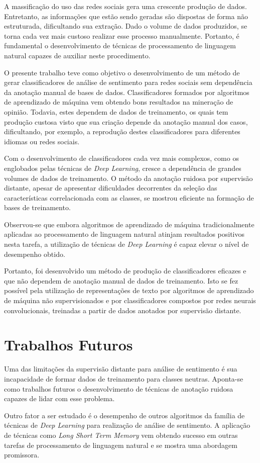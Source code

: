 A massificação do uso das redes sociais gera uma crescente produção de dados.
Entretanto, as informações que estão sendo geradas são dispostas de forma não estruturada, dificultando sua extração.
Dado o volume de dados produzidos, se torna cada vez mais custoso realizar esse processo manualmente.
Portanto, é fundamental o desenvolvimento de técnicas de processamento de linguagem natural capazes de auxiliar neste
procedimento.

O presente trabalho teve como objetivo o desenvolvimento de um método de gerar classificadores de análise de sentimento
para redes sociais sem dependência da anotação manual de bases de dados.
Classificadores formados por algoritmos de aprendizado de máquina vem obtendo bons resultados na mineração de opinião.
Todavia, estes dependem de dados de treinamento, os quais tem produção custosa visto que sua criação depende da anotação
manual dos casos, dificultando, por exemplo, a reprodução destes classificadores para diferentes idiomas ou redes
sociais.

Com o desenvolvimento de classificadores cada vez mais complexos, como os englobados pelas técnicas de
\textit{Deep Learning}, cresce a dependência de grandes volumes de dados de treinamento.
O método da anotação ruidosa por supervisão distante, apesar de apresentar dificuldades decorrentes da seleção das
características correlacionada com as classes, se mostrou eficiente na formação de bases de treinamento.

Observou-se que embora algoritmos de aprendizado de máquina tradicionalmente aplicadas ao processamento de linguagem
natural atinjam resultados positivos nesta tarefa, a utilização de técnicas de \textit{Deep Learning} é capaz elevar o
nível de desempenho obtido.

Portanto, foi desenvolvido um método de produção de classificadores eficazes e que não dependem de anotação manual de
dados de treinamento.
Isto se fez possível pela utilização de representações de texto por algoritmos de aprendizado de máquina não
supervisionados e por classificadores compostos por redes neurais convolucionais, treinadas a partir de dados anotados
por supervisão distante.

\section{Trabalhos Futuros}

Uma das limitações da supervisão distante para análise de sentimento é sua incapacidade de formar dados de treinamento
para classes neutras.
Aponta-se como trabalhos futuros o desenvolvimento de técnicas de anotação ruidosa capazes de lidar com esse problema.

Outro fator a ser estudado é o desempenho de outros algoritmos da família de técnicas de \textit{Deep Learning} para
realização de análise de sentimento.
A aplicação de técnicas como \textit{Long Short Term Memory} vem obtendo sucesso em outras tarefas de processamento de
linguagem natural e se mostra uma abordagem promissora.
